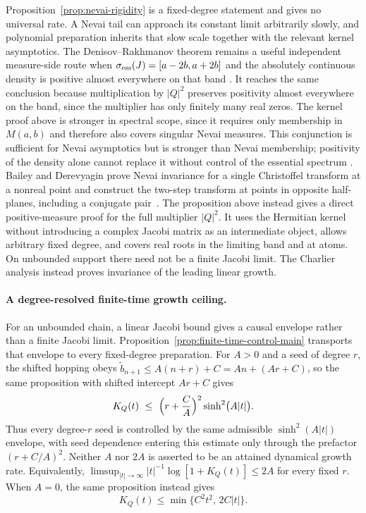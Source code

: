 \documentclass[a4paper,11pt]{article}
\def\Jac{J}%
\theoremstyle{definition}
\theoremstyle{remark}
\newcommand{\Jac}{\mathsf J}
\begin{document}
Proposition~\ref{prop:nevai-rigidity} is a fixed-degree statement and gives no universal
rate.  A Nevai tail can approach its constant limit arbitrarily slowly, and polynomial
preparation inherits that slow scale together with the relevant kernel asymptotics.  The
Denisov--Rakhmanov theorem remains a useful independent measure-side route when $\sigma_{\rm ess}(\Jac)=[a-2b,a+2b]$ and the absolutely
continuous density is positive almost everywhere on that band
\cite{Rakhmanov1982,Denisov2004}.  It reaches the same conclusion because multiplication by
$|Q|^2$ preserves positivity almost everywhere on the band, since the multiplier has only finitely many real zeros.  The kernel proof above is stronger in
spectral scope, since it requires only membership in $M(a,b)$ and therefore also covers singular
Nevai measures.  This conjunction is sufficient for Nevai asymptotics but is stronger than Nevai membership; positivity of the density alone cannot replace it without control of the essential spectrum \cite{Remling2011}. 
Bailey and Derevyagin prove Nevai invariance for a single Christoffel transform at a nonreal point and construct the two-step transform at points in opposite half-planes, including a conjugate pair~\cite{BaileyDerevyagin2021}. The proposition above instead gives a direct positive-measure proof for the full multiplier $|Q|^2$. It uses the Hermitian kernel without introducing a complex Jacobi matrix as an intermediate object, allows arbitrary fixed degree, and covers real roots in the limiting band and at atoms.   On unbounded
support there need not be a finite Jacobi limit.  The Charlier
analysis instead proves invariance of the leading linear growth.

\paragraph{A degree-resolved finite-time growth ceiling.}
\label{subsec:exponent-rigidity}

For an unbounded chain, a linear Jacobi bound gives a causal envelope rather than a finite
Jacobi limit.  Proposition~\ref{prop:finite-time-control-main} transports that envelope to every
fixed-degree preparation.
For $A>0$ and a seed of degree $r$, the shifted hopping obeys
$\widetilde b_{n+1}\le A(n+r)+C=An+(Ar+C)$, so the same proposition with shifted intercept
$Ar+C$ gives
\begin{equation}
   K_Q(t)\ \le\ \Bigl(r+\frac{C}{A}\Bigr)^{2}\sinh^{2}\bigl(A|t|\bigr).
   \label{eq:exponent-rigidity}
\end{equation}
Thus every degree-$r$ seed is controlled by the same admissible $\sinh^2(A|t|)$ envelope, with
seed dependence entering this estimate only through the prefactor $(r+C/A)^2$.  Neither $A$ nor
$2A$ is asserted to be an attained dynamical growth rate.  Equivalently,
$\limsup_{|t|\to\infty}|t|^{-1}\log[1+K_Q(t)]\le2A$ for every fixed $r$.
When $A=0$, the same proposition instead gives
\begin{equation}
   K_Q(t)\le \min\{C^2t^2,\,2C|t|\}.
   \label{eq:zero-slope-finite-time-ceiling}
\end{equation}
\end{document}
